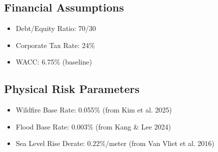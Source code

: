 \documentclass[11pt,a4paper]{article}
\begin{document}
\subsection{Financial Assumptions}
\begin{itemize}
\item Debt/Equity Ratio: 70/30
\item Corporate Tax Rate: 24\%
\item WACC: 6.75\% (baseline)
\end{itemize}

\subsection{Physical Risk Parameters}
\begin{itemize}
\item Wildfire Base Rate: 0.055\% (from Kim et al. 2025)
\item Flood Base Rate: 0.003\% (from Kang \& Lee 2024)
\item Sea Level Rise Derate: 0.22\%/meter (from Van Vliet et al. 2016)
\end{itemize}
\end{document}
